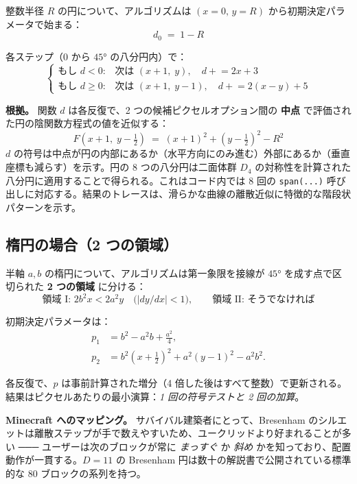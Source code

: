 \documentclass[12pt,a4paper]{scrartcl}
\newcommand{\code}[1]{\texttt{\small #1}}
\newcommand{\acc}[1]{\textcolor{accent}{\textbf{#1}}}
\begin{document}
整数半径 $R$ の円について、アルゴリズムは $(x{=}0,\,y{=}R)$ から初期決定パラメータで始まる：
\[
d_0 \;=\; 1 - R
\]

各ステップ（$0$ から $45°$ の八分円内）で：
\[
\begin{cases}
\text{もし } d < 0: & \text{次は } (x{+}1,\;y), \quad d \mathrel{+}= 2x+3 \\[2pt]
\text{もし } d \geq 0: & \text{次は } (x{+}1,\;y{-}1), \quad d \mathrel{+}= 2(x-y)+5
\end{cases}
\]

\textbf{根拠。} 関数 $d$ は各反復で、2 つの候補ピクセルオプション間の \acc{中点} で評価された円の陰関数方程式の値を近似する：
\[
F\!\left(x+1,\;y-\tfrac{1}{2}\right) \;=\; (x+1)^2 + \left(y-\tfrac{1}{2}\right)^{\!2} - R^2
\]
$d$ の符号は中点が円の内部にあるか（水平方向にのみ進む）外部にあるか（垂直座標も減らす）を示す。円の 8 つの八分円は二面体群 $D_4$ の対称性を計算された八分円に適用することで得られる。これはコード内では 8 回の \code{span(...)} 呼び出しに対応する。結果のトレースは、滑らかな曲線の離散近似に特徴的な階段状パターンを示す。

\subsection{楕円の場合（2 つの領域）}

半軸 $a, b$ の楕円について、アルゴリズムは第一象限を接線が $45°$ を成す点で区切られた \acc{2 つの領域} に分ける：
\[
\text{領域 I: } 2b^2 x < 2a^2 y \quad \bigl(|dy/dx| < 1\bigr),
\qquad
\text{領域 II: そうでなければ}
\]

初期決定パラメータは：
\begin{align*}
p_1 &= b^2 - a^2 b + \tfrac{a^2}{4}, \\
p_2 &= b^2\!\left(x+\tfrac{1}{2}\right)^{\!2} + a^2\!\left(y-1\right)^{\!2} - a^2 b^2.
\end{align*}

各反復で、$p$ は事前計算された増分（4 倍した後はすべて整数）で更新される。結果はピクセルあたりの最小演算：\emph{1 回の符号テストと 2 回の加算}。

\begin{minec}
\textbf{Minecraft へのマッピング。} サバイバル建築者にとって、Bresenham のシルエットは離散ステップが手で数えやすいため、ユークリッドより好まれることが多い ─── ユーザーは次のブロックが常に \emph{まっすぐ} か \emph{斜め} かを知っており、配置動作が一貫する。$D=11$ の Bresenham 円は数十の解説書で公開されている標準的な $80$ ブロックの系列を持つ。
\end{minec}
\end{document}
